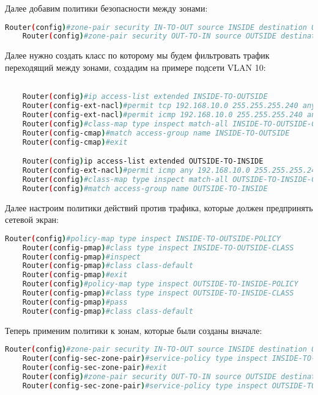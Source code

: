 Далее добавим политики безопасности между зонами:

\begin{lstlisting}[language=sh]
    Router(config)#zone-pair security IN-TO-OUT source INSIDE destination OUTSIDE
    Router(config)#zone-pair security OUT-TO-IN source OUTSIDE destination INSIDE
\end{lstlisting}

Далее нужно создать класс по которому мы будем фильтровать трафик переходящий между зонами, создадим на примере подсети VLAN 10:

\begin{lstlisting}[language=sh]

    Router(config)#ip access-list extended INSIDE-TO-OUTSIDE
    Router(config-ext-nacl)#permit tcp 192.168.10.0 255.255.255.240 any eq www
    Router(config-ext-nacl)#permit icmp 192.168.10.0 255.255.255.240 any
    Router(config)#class-map type inspect match-all INSIDE-TO-OUTSIDE-CLASS
    Router(config-cmap)#match access-group name INSIDE-TO-OUTSIDE
    Router(config-cmap)#exit

    Router(config)ip access-list extended OUTSIDE-TO-INSIDE
    Router(config-ext-nacl)#permit icmp any 192.168.10.0 255.255.255.240
    Router(config)#class-map type inspect match-all OUTSIDE-TO-INSIDE-CLASS
    Router(config)#match access-group name OUTSIDE-TO-INSIDE

\end{lstlisting}

Далее настроим политики действий против трафика, которые должен предпринять сетевой экран:

\begin{lstlisting}[language=sh]
    Router(config)#policy-map type inspect INSIDE-TO-OUTSIDE-POLICY
    Router(config-pmap)#class type inspect INSIDE-TO-OUTSIDE-CLASS
    Router(config-pmap)#inspect
    Router(config-pmap)#class class-default
    Router(config-pmap)#exit
    Router(config)#policy-map type inspect OUTSIDE-TO-INSIDE-POLICY
    Router(config-pmap)#class type inspect OUTSIDE-TO-INSIDE-CLASS
    Router(config-pmap)#pass
    Router(config-pmap)#class class-default
\end{lstlisting}

Теперь применим политики к зонам, которые были созданы вначале:

\begin{lstlisting}[language=sh]
    Router(config)#zone-pair security IN-TO-OUT source INSIDE destination OUTSIDE
    Router(config-sec-zone-pair)#service-policy type inspect INSIDE-TO-OUTSIDE-POLICY
    Router(config-sec-zone-pair)#exit
    Router(config)#zone-pair security OUT-TO-IN source OUTSIDE destination INSIDE
    Router(config-sec-zone-pair)#service-policy type inspect OUTSIDE-TO-INSIDE-POLICY
\end{lstlisting}

